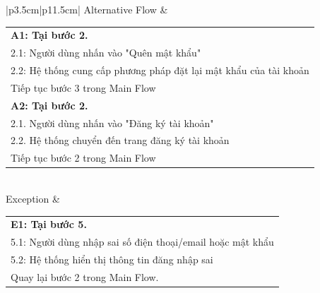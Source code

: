 \begin{enumerate}[a.]
\begin{longtable}{|p{3.5cm}|p{11.5cm}|}
        \hline
        Alternative Flow &
        \begin{tabular}[c]{@{}p{\linewidth}} 
          \textbf{A1: Tại bước 2.}\\
           2.1: Người dùng nhấn vào "Quên mật khẩu" \\
           2.2: Hệ thống cung cấp phương pháp đặt lại mật khẩu của tài khoản\\
        Tiếp tục bước 3 trong Main Flow \\
            \textbf{A2: Tại bước 2.} \\
            2.1. Người dùng nhấn vào "Đăng ký tài khoản"\\
            2.2. Hệ thống chuyển đến trang đăng ký tài khoản \\
        Tiếp tục bước 2 trong Main Flow\\
        \end{tabular} \\ 
        \hline
        Exception & 
        \begin{tabular}[c]{@{}p{\linewidth}} 
          \textbf{E1: Tại bước 5.}\\
           5.1: Người dùng nhập sai số điện thoại/email hoặc mật khẩu\\
           5.2:  Hệ thống hiển thị thông tin đăng nhập sai \\
          Quay lại bước 2 trong Main Flow.\\
        \end{tabular} \\ \hline
        \caption{Use-case đăng nhập}
    \end{longtable}
    
    \newpage
    

\end{enumerate}
